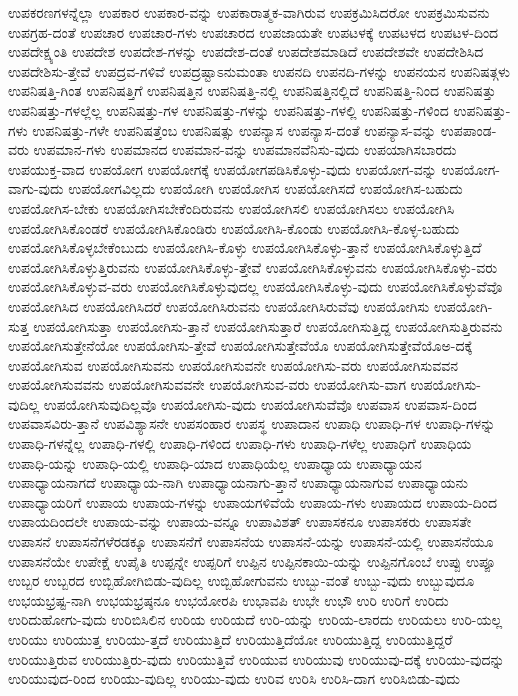 {ಉಪಕರಣಗಳನ್ನೆಲ್ಲಾ
ಉಪಕಾರ
ಉಪಕಾರ-ವನ್ನು
ಉಪಕಾರಾತ್ಮಕ-ವಾಗಿರುವ
ಉಪಕ್ರಮಿಸಿದರೋ
ಉಪಕ್ರಮಿಸುವನು
ಉಪಗ್ರಹ-ದಂತೆ
ಉಪಚಾರ
ಉಪಚಾರ-ಗಳು
ಉಪಚಾರದ
ಉಪಜಾಯತೇ
ಉಪಟಳಕ್ಕೆ
ಉಪಟಳದ
ಉಪಟಳ-ದಿಂದ
ಉಪದೇಕ್ಷ್ಯಂತಿ
ಉಪದೇಶ
ಉಪದೇಶ-ಗಳನ್ನು
ಉಪದೇಶ-ದಂತೆ
ಉಪದೇಶಮಾಡಿದೆ
ಉಪದೇಶವೇ
ಉಪದೇಶಿಸಿದ
ಉಪದೇಶಿಸು-ತ್ತೇವೆ
ಉಪದ್ರವ-ಗಳಿವೆ
ಉಪದ್ರಷ್ಟಾಽನುಮಂತಾ
ಉಪನದಿ
ಉಪನದಿ-ಗಳನ್ನು
ಉಪನಯನ
ಉಪನಿಷತ್ಗಳು
ಉಪನಿಷತ್ತಿ-ಗಿಂತ
ಉಪನಿಷತ್ತಿಗೆ
ಉಪನಿಷತ್ತಿನ
ಉಪನಿಷತ್ತಿ-ನಲ್ಲಿ
ಉಪನಿಷತ್ತಿನಲ್ಲಿದೆ
ಉಪನಿಷತ್ತಿ-ನಿಂದ
ಉಪನಿಷತ್ತು
ಉಪನಿಷತ್ತು-ಗಳಲ್ಲೆಲ್ಲ
ಉಪನಿಷತ್ತು-ಗಳ
ಉಪನಿಷತ್ತು-ಗಳನ್ನು
ಉಪನಿಷತ್ತು-ಗಳಲ್ಲಿ
ಉಪನಿಷತ್ತು-ಗಳಿಂದ
ಉಪನಿಷತ್ತು-ಗಳು
ಉಪನಿಷತ್ತು-ಗಳೇ
ಉಪನಿಷತ್ತೆಂಬ
ಉಪನಿಷತ್ಸು
ಉಪನ್ಯಾಸ
ಉಪನ್ಯಾಸ-ದಂತೆ
ಉಪನ್ಯಾಸ-ವನ್ನು
ಉಪಪಾಂಡ-ವರು
ಉಪಮಾನ-ಗಳು
ಉಪಮಾನದ
ಉಪಮಾನ-ವನ್ನು
ಉಪಮಾನವೆನಿಸು-ವುದು
ಉಪಯಾಗಿಸಬಾರದು
ಉಪಯುಕ್ತ-ವಾದ
ಉಪಯೋಗ
ಉಪಯೋಗಕ್ಕೆ
ಉಪಯೋಗಪಡಿಸಿಕೊಳ್ಳು-ವುದು
ಉಪಯೋಗ-ವನ್ನು
ಉಪಯೋಗ-ವಾಗು-ವುದು
ಉಪಯೋಗವಿಲ್ಲದು
ಉಪಯೋಗಿ
ಉಪಯೋಗಿಸ
ಉಪಯೋಗಿಸದೆ
ಉಪಯೋಗಿಸ-ಬಹುದು
ಉಪಯೋಗಿಸ-ಬೇಕು
ಉಪಯೋಗಿಸಬೇಕೆಂದಿರುವನು
ಉಪಯೋಗಿಸಲಿ
ಉಪಯೋಗಿಸಲು
ಉಪಯೋಗಿಸಿ
ಉಪಯೋಗಿಸಿಕೊಂಡರೆ
ಉಪಯೋಗಿಸಿಕೊಂಡಿರು
ಉಪಯೋಗಿಸಿ-ಕೊಂಡು
ಉಪಯೋಗಿಸಿ-ಕೊಳ್ಳ-ಬಹುದು
ಉಪಯೋಗಿಸಿಕೊಳ್ಳಬೇಕೆಂಬುದು
ಉಪಯೋಗಿಸಿ-ಕೊಳ್ಳು
ಉಪಯೋಗಿಸಿಕೊಳ್ಳು-ತ್ತಾನೆ
ಉಪಯೋಗಿಸಿಕೊಳ್ಳುತ್ತಿದೆ
ಉಪಯೋಗಿಸಿಕೊಳ್ಳುತ್ತಿರುವನು
ಉಪಯೋಗಿಸಿಕೊಳ್ಳು-ತ್ತೇವೆ
ಉಪಯೋಗಿಸಿಕೊಳ್ಳುವನು
ಉಪಯೋಗಿಸಿಕೊಳ್ಳು-ವರು
ಉಪಯೋಗಿಸಿಕೊಳ್ಳುವ-ವರು
ಉಪಯೋಗಿಸಿಕೊಳ್ಳುವುದಲ್ಲ
ಉಪಯೋಗಿಸಿಕೊಳ್ಳು-ವುದು
ಉಪಯೋಗಿಸಿಕೊಳ್ಳುವೆವೊ
ಉಪಯೋಗಿಸಿದ
ಉಪಯೋಗಿಸಿದರೆ
ಉಪಯೋಗಿಸಿರುವನು
ಉಪಯೋಗಿಸಿರುವೆವು
ಉಪಯೋಗಿಸು
ಉಪಯೋಗಿ-ಸುತ್ತ
ಉಪಯೋಗಿಸುತ್ತಾ
ಉಪಯೋಗಿಸು-ತ್ತಾನೆ
ಉಪಯೋಗಿಸುತ್ತಾರೆ
ಉಪಯೋಗಿಸುತ್ತಿದ್ದ
ಉಪಯೋಗಿಸುತ್ತಿರುವನು
ಉಪಯೋಗಿಸುತ್ತೇನೆಯೋ
ಉಪಯೋಗಿಸು-ತ್ತೇವೆ
ಉಪಯೋಗಿಸುತ್ತೇವೆಯೊ
ಉಪಯೋಗಿಸುತ್ತೇವೆಯೊಅ-ದಕ್ಕೆ
ಉಪಯೋಗಿಸುವ
ಉಪಯೋಗಿಸುವನು
ಉಪಯೋಗಿಸುವನೇ
ಉಪಯೋಗಿಸು-ವರು
ಉಪಯೋಗಿಸುವವನ
ಉಪಯೋಗಿಸುವವನು
ಉಪಯೋಗಿಸುವವನೇ
ಉಪಯೋಗಿಸುವ-ವರು
ಉಪಯೋಗಿಸು-ವಾಗ
ಉಪಯೋಗಿಸು-ವುದಿಲ್ಲ
ಉಪಯೋಗಿಸುವುದಿಲ್ಲವೊ
ಉಪಯೋಗಿಸು-ವುದು
ಉಪಯೋಗಿಸುವೆವೊ
ಉಪವಾಸ
ಉಪವಾಸ-ದಿಂದ
ಉಪವಾಸವಿರು-ತ್ತಾನೆ
ಉಪವಿಶ್ಯಾಸನೇ
ಉಪಸಂಹಾರ
ಉಪಸ್ಥ
ಉಪಾದಾನ
ಉಪಾಧಿ
ಉಪಾಧಿ-ಗಳ
ಉಪಾಧಿ-ಗಳನ್ನು
ಉಪಾಧಿ-ಗಳನ್ನೆಲ್ಲ
ಉಪಾಧಿ-ಗಳಲ್ಲಿ
ಉಪಾಧಿ-ಗಳಿಂದ
ಉಪಾಧಿ-ಗಳು
ಉಪಾಧಿ-ಗಳೆಲ್ಲ
ಉಪಾಧಿಗೆ
ಉಪಾಧಿಯ
ಉಪಾಧಿ-ಯನ್ನು
ಉಪಾಧಿ-ಯಲ್ಲಿ
ಉಪಾಧಿ-ಯಾದ
ಉಪಾಧಿಯೆಲ್ಲ
ಉಪಾಧ್ಯಾಯ
ಉಪಾಧ್ಯಾಯನ
ಉಪಾಧ್ಯಾಯನಾಗದೆ
ಉಪಾಧ್ಯಾಯ-ನಾಗಿ
ಉಪಾಧ್ಯಾಯನಾಗು-ತ್ತಾನೆ
ಉಪಾಧ್ಯಾಯನಾಗುವ
ಉಪಾಧ್ಯಾಯನು
ಉಪಾಧ್ಯಾಯರಿಗೆ
ಉಪಾಯ
ಉಪಾಯ-ಗಳನ್ನು
ಉಪಾಯಗಳಿವೆಯೆ
ಉಪಾಯ-ಗಳು
ಉಪಾಯದ
ಉಪಾಯ-ದಿಂದ
ಉಪಾಯದಿಂದಲೇ
ಉಪಾಯ-ವನ್ನು
ಉಪಾಯ-ವನ್ನೂ
ಉಪಾವಿಶತ್
ಉಪಾಸಕನೂ
ಉಪಾಸಕರು
ಉಪಾಸತೇ
ಉಪಾಸನೆ
ಉಪಾಸನೆಗಳೆರಡಕ್ಕೂ
ಉಪಾಸನೆಗೆ
ಉಪಾಸನೆಯ
ಉಪಾಸನೆ-ಯನ್ನು
ಉಪಾಸನೆ-ಯಲ್ಲಿ
ಉಪಾಸನೆಯೂ
ಉಪಾಸನೆಯೇ
ಉಪೇಕ್ಷೆ
ಉಪೈತಿ
ಉಪ್ಪನ್ನೇ
ಉಪ್ಪರಿಗೆ
ಉಪ್ಪಿನ
ಉಪ್ಪಿನಕಾಯಿ-ಯನ್ನು
ಉಪ್ಪಿನಗೊಂಬೆ
ಉಪ್ಪು
ಉಪ್ಪೂ
ಉಬ್ಬರ
ಉಬ್ಬರದ
ಉಬ್ಬಿಹೋಗಿಬಿಡು-ವುದಿಲ್ಲ
ಉಬ್ಬಿಹೋಗುವನು
ಉಬ್ಬು-ವಂತೆ
ಉಬ್ಬು-ವುದು
ಉಬ್ಬುವುದೂ
ಉಭಯಭ್ರಷ್ಟ-ನಾಗಿ
ಉಭಯಭ್ರಷ್ಠನೂ
ಉಭಯೋರಪಿ
ಉಭಾವಪಿ
ಉಭೇ
ಉಭೌ
ಉರಿ
ಉರಿಗೆ
ಉರಿದು
ಉರಿದುಹೋಗು-ವುದು
ಉರಿಬಿಸಿಲಿನ
ಉರಿಯ
ಉರಿಯದೆ
ಉರಿ-ಯನ್ನು
ಉರಿಯ-ಲಾರದು
ಉರಿಯಲು
ಉರಿ-ಯಲ್ಲ
ಉರಿಯು
ಉರಿಯುತ್ತ
ಉರಿಯು-ತ್ತದೆ
ಉರಿಯುತ್ತಿದೆ
ಉರಿಯುತ್ತಿದೆಯೋ
ಉರಿಯುತ್ತಿದ್ದ
ಉರಿಯುತ್ತಿದ್ದರೆ
ಉರಿಯುತ್ತಿರುವ
ಉರಿಯುತ್ತಿರು-ವುದು
ಉರಿಯುತ್ತಿವೆ
ಉರಿಯುವ
ಉರಿಯುವು
ಉರಿಯುವು-ದಕ್ಕೆ
ಉರಿಯು-ವುದನ್ನು
ಉರಿಯುವುದ-ರಿಂದ
ಉರಿಯು-ವುದಿಲ್ಲ
ಉರಿಯು-ವುದು
ಉರಿವ
ಉರಿಸಿ
ಉರಿಸಿ-ದಾಗ
ಉರಿಸಿಬಿಡು-ವುದು
}
